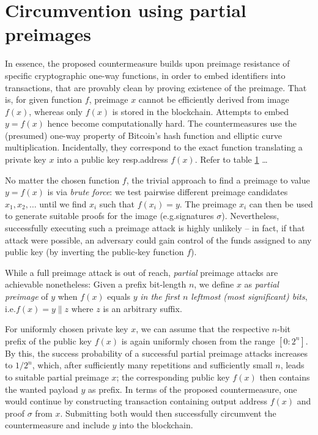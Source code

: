 \documentclass[a4paper,11pt,titlepage]{scrbook}
\begin{document}
\section{Circumvention using partial preimages}


In essence, the proposed countermeasure builds upon preimage resistance of specific cryptographic one-way functions,
in order to embed identifiers into transactions, that are provably clean by proving existence of the preimage.
That is, for given function $f$, preimage $x$ cannot be efficiently derived from image $f(x)$, whereas only $f(x)$ is stored in the blockchain.
Attempts to embed $y=f(x)$ hence become computationally hard.
The countermeasures use the (presumed) one-way property of Bitcoin's hash function and elliptic curve multiplication.
Incidentally, they correspond to the exact function translating a private key $x$ into a public key resp.\@ address $f(x)$.
Refer to table \ref{} \dots %

No matter the chosen function $f$, the trivial approach to find a preimage to value $y=f(x)$ is via \emph{brute force}: we test pairwise different preimage candidates $x_1, x_2, \dots$ until we find $x_i$ such that $f(x_i)=y$.
The preimage $x_i$ can then be used to generate suitable proofs for the image (e.g.\@ signatures $\sigma$).
Nevertheless, successfully executing such a preimage attack is highly unlikely – in fact, if that attack were possible, an adversary could gain control of the funds assigned to any public key (by inverting the public-key function $f$).

While a full preimage attack is out of reach, \emph{partial} preimage attacks are achievable nonetheless:
Given a prefix bit-length $n$, we define $x$ as \emph{partial preimage} of $y$ when $f(x)$ equals $y$ \emph{in the first $n$ leftmost (most significant) bits}, i.e.\@ $f(x)=y\|z$ where $z$ is an arbitrary suffix.

For uniformly chosen private key $x$, we can assume that the respective $n$-bit prefix of the public key $f(x)$ is again uniformly chosen from the range $[0{:}2^n]$.
By this, the success probability of a successful partial preimage attacks increases to $1/2^n$, which, after sufficiently many repetitions and sufficiently small $n$, leads to suitable partial preimage $x$; the corresponding public key $f(x)$ then contains the wanted payload $y$ as prefix.
In terms of the proposed countermeasure, one would continue by constructing transaction containing output address $f(x)$ and proof $\sigma$ from $x$.
Submitting both would then successfully circumvent the countermeasure and include $y$ into the blockchain.
\end{document}
